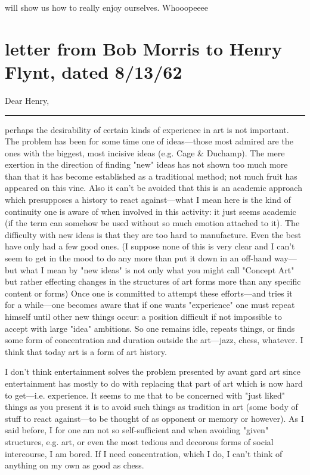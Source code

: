 \documentclass[10pt,twoside,draft]{memoir}
\newcommand{\gap}{\plainbreak{2}}
\begin{document}
{

will show us how to really enjoy ourselves. Whooopeeee 


\clearpage

\section{letter from Bob Morris to Henry Flynt, dated 8/13/62}

Dear Henry, 

\gap

perhaps the desirability of certain kinds of experience in art is not 
important. The problem has been for some time one of ideas---those most 
admired are the ones with the biggest, most incisive ideas (e.g. Cage \& 
Duchamp). The mere exertion in the direction of finding "new" ideas has 
not shown too much more than that it has become established as a 
traditional method; not much fruit has appeared on this vine. Also it can't be 
avoided that this is an academic approach which presupposes a history to 
react against---what I mean here is the kind of continuity one is aware of 
when involved in this activity: it just seems academic (if the term can 
somehow be used without so much emotion attached to it). The difficulty 
with new ideas is that they are too hard to manufacture. Even the best have 
only had a few good ones. (I suppose none of this is very clear and I can't 
seem to get in the mood to do any more than put it down in an off-hand 
way---but what I mean by "new ideas" is not only what you might call
"Concept Art" but rather effecting changes in the structures of art forms 
more than any specific content or forms) Once one is committed to attempt 
these efforts---and tries it for a while---one becomes aware that if one wants 
"experience" one must repeat himself until other new things occur: a 
position difficult if not impossible to accept with large "idea" ambitions. So 
one remains idle, repeats things, or finds some form of concentration and 
duration outside the art---jazz, chess, whatever. I think that today art is a 
form of art history. 

I don't think entertainment solves the problem presented by avant gard art 
since entertainment has mostly to do with replacing that part of art which is 
now hard to get---i.e. experience. It seems to me that to be concerned with 
"just liked" things as you present it is to avoid such things as tradition in art 
(some body of stuff to react against---to be thought of as opponent or 
memory or however). As I said before, I for one am not so self-sufficient and 
when avoiding "given" structures, e.g. art, or even the most tedious and 
decorous forms of social intercourse, I am bored. If I need concentration, 
which I do, I can't think of anything on my own as good as chess. 

}
\end{document}
